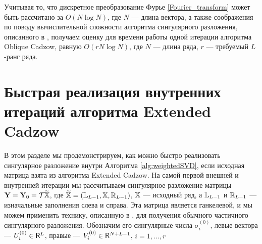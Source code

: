 \documentclass[12pt, specialist, subf,href,colorlinks=true,substylefile = spbu.rtx]{disser}
\theoremstyle{remark}
\theoremstyle{definition}
\begin{document}
Учитывая то, что дискретное преобразование Фурье \eqref{Fourier_transform} может быть рассчитано за $O(N \log N)$, где $N$ --- длина вектора, а также соображения по поводу вычислительной сложности алгоритма сингулярного разложения, описанного в \cite{Korobeynikov2010}, получаем оценку для времени работы одной итерации алгоритма Oblique Cadzow, равную $O(r N \log N)$, где $N$ --- длина ряда, $r$ --- требуемый $L$-ранг ряда.

\section{Быстрая реализация внутренних итераций алгоритма Extended Cadzow}
В этом разделе мы продемонстрируем, как можно быстро реализовать сингулярное разложение внутри Алгоритма \ref{alg:weightedSVD}, если исходная матрица взята из алгоритма Extended Cadzow. На самой первой внешней и внутренней итерации мы рассчитываем сингулярное разложение матрицы $\mathbf{Y} = \mathbf{Y}_0 = \mathcal{T} \widetilde{\mathbb{X}}$, где $\widetilde{\mathbb{X}}=(\mathbb{L}_{L-1}, \mathbb{X}, \mathbb{R}_{L-1})$, $\mathbb{X}$ --- исходный ряд, а $\mathbb{L}_{L-1}$ и $\mathbb{R}_{L-1}$ --- изначальные заполнения слева и справа. Эта матрица является ганкелевой, и мы можем применить технику, описанную в \cite{Korobeynikov2010}, для получения обычного частичного сингулярного разложения. Обозначим его сингулярные числа $\sigma_i^{(0)}$, левые вектора --- $U_i^{(0)} \in \mathsf{R}^L$, правые --- $V_i^{(0)} \in \mathsf{R}^{N + L - 1}$, $i = 1, \ldots, r$
\end{document}
